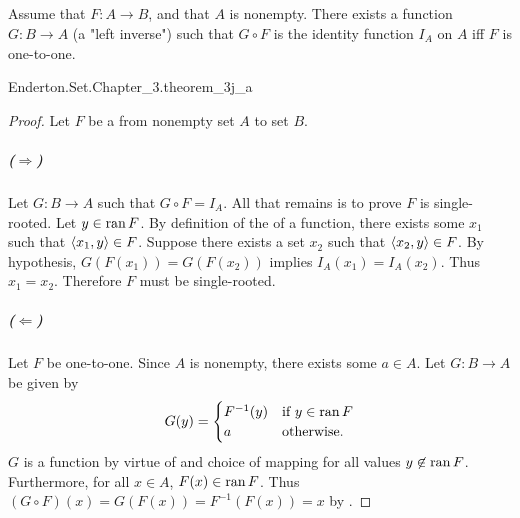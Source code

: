 \documentclass{report}
\begin{document}
\subsection{}%

  \begin{theorem}[3J(a)]
    Assume that $F \colon A \rightarrow B$, and that $A$ is nonempty.
    There exists a function $G \colon B \rightarrow A$ (a "left inverse") such
      that $G \circ F$ is the identity function $I_A$ on $A$ iff $F$ is
      one-to-one.
  \end{theorem}

    {Enderton.Set.Chapter\_3.theorem\_3j\_a}

  \begin{proof}

    Let $F$ be a  from nonempty set $A$ to set $B$.

    \subparagraph{($\Rightarrow$)}%

      Let $G \colon B \rightarrow A$ such that $G \circ F = I_A$.
      All that remains is to prove $F$ is single-rooted.
      Let $y \in \mathop{\text{ran}}{F}$.
      By definition of the  of a function, there exists
        some $x_1$ such that $\left< x_1, y \right> \in F$.
      Suppose there exists a set $x_2$ such that $\left< x_2, y \right> \in F$.
      By hypothesis, $G(F(x_1)) = G(F(x_2))$ implies $I_A(x_1) = I_A(x_2)$.
      Thus $x_1 = x_2$.
      Therefore $F$ must be single-rooted.

    \subparagraph{($\Leftarrow$)}%

      Let $F$ be one-to-one.
      Since $A$ is nonempty, there exists some $a \in A$.
      Let $G \colon B \rightarrow A$ be given by
        $$G(y) = \begin{cases}
          F^{-1}(y) & \text{if } y \in \mathop{\text{ran}}{F} \\
          a & \text{otherwise}.
        \end{cases}$$
      $G$ is a function by virtue of  and
        choice of mapping for all values $y \not\in \mathop{\text{ran}}{F}$.
      Furthermore, for all $x \in A$, $F(x) \in \mathop{\text{ran}}{F}$.
      Thus $(G \circ F)(x) = G(F(x)) = F^{-1}(F(x)) = x$ by
        .

  \end{proof}

\subsection{}%
\end{document}
